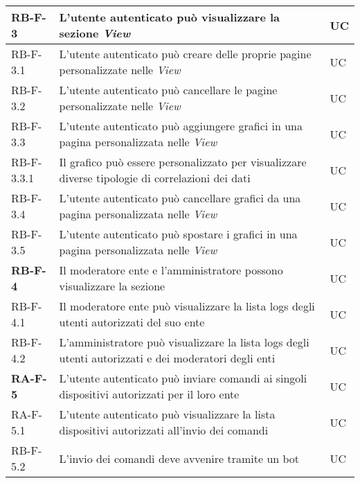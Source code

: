 \begin{center}
\begin{longtable}{|p{3cm}|p{9.85cm}|p{2cm}|}
		\textbf{RB-F-3} & L'utente autenticato può visualizzare la sezione \textit{View} & UC \\ \hline
		{\color{gray} RB-F-}3.1 & L'utente autenticato può creare delle proprie pagine personalizzate nelle \textit{View} & UC \\ \hline
		{\color{gray} RB-F-}3.2 & L'utente autenticato può cancellare le pagine personalizzate nelle \textit{View} & UC \\ \hline
		{\color{gray} RB-F-}3.3 & L'utente autenticato può aggiungere grafici in una pagina personalizzata nelle \textit{View} & UC \\ \hline
		{\color{gray} RB-F-}3.3.1 & Il grafico può essere personalizzato per visualizzare diverse tipologie di correlazioni dei dati & UC \\ \hline
		{\color{gray} RB-F-}3.4 & L'utente autenticato può cancellare grafici da una pagina personalizzata nelle \textit{View} & UC \\ \hline
		{\color{gray} RB-F-}3.5 & L'utente autenticato può spostare i grafici in una pagina personalizzata nelle \textit{View} & UC \\ \hline

		\textbf{RB-F-4} & Il moderatore ente e l'amministratore possono visualizzare la sezione \glock{Logs} & UC \\ \hline
		{\color{gray} RB-F-}4.1 & Il moderatore ente può visualizzare la lista logs degli utenti autorizzati del suo ente & UC \\ \hline
		{\color{gray} RB-F-}4.2 & L'amministratore può visualizzare la lista logs degli utenti autorizzati e dei moderatori degli enti & UC \\ \hline

		\textbf{RA-F-5} & L'utente autenticato può inviare comandi ai singoli dispositivi autorizzati per il loro ente & UC \\ \hline
		{\color{gray} RA-F-}5.1 & L'utente autenticato può visualizzare la lista dispositivi autorizzati all'invio dei comandi & UC \\ \hline
		{\color{gray} RB-F-}5.2 & L'invio dei comandi deve avvenire tramite un bot \glock{Telegram} & UC \\ \hline


\end{longtable}
\end{center}
